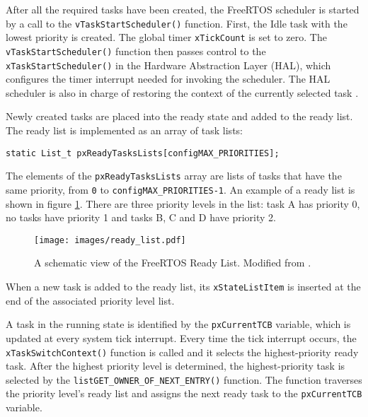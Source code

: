 After all the required tasks have been created, the FreeRTOS scheduler is started by a call to the 
\verb$vTaskStartScheduler()$ function. 
First, the Idle task with the lowest priority is created.
The global timer \verb$xTickCount$ is set to zero. 
The \verb$vTaskStartScheduler()$ function then passes control to the \verb$xTaskStartScheduler()$ in the Hardware Abstraction Layer (HAL), which configures the timer interrupt needed for invoking the scheduler. 
The HAL scheduler is also in charge of restoring the context of the currently selected task
\cite{goyette2007analysis}. 

Newly created tasks are placed into the ready state and added to the ready list. 
The ready list is implemented as an array of task lists:
\begin{lstlisting}[frame=none, label={lst:readylist}, caption={Ready task list}, captionpos=b]
static List_t pxReadyTasksLists[configMAX_PRIORITIES];
\end{lstlisting}
The elements of the \verb$pxReadyTasksLists$ array are lists of tasks that have the same priority, from \verb$0$ to \verb$configMAX_PRIORITIES-1$.
An example of a ready list is shown in figure \ref{freertos:ready}.
There are three priority levels in the list: task A has priority 0, no tasks have priority 1 and tasks B, C and D have priority 2. 

\begin{figure}[ht]
    \centering
    \texttt{[image: images/ready\_list.pdf]}
    \caption{A schematic view of the FreeRTOS Ready List. Modified from \cite{brown2012architecture}.}
    \label{freertos:ready}
\end{figure}
When a new task is added to the ready list, its \verb$xStateListItem$ is inserted at the end of the 
associated priority level list.

A task in the running state is identified by the \verb$pxCurrentTCB$ variable, which is updated at every system tick interrupt. 
Every time the tick interrupt occurs, the \verb$xTaskSwitchContext()$ function is called and it selects the highest-priority ready task.
After the highest priority level is determined,
the highest-priority task is selected by the \verb$listGET_OWNER_OF_NEXT_ENTRY()$ function.
The function traverses the priority level's ready list and assigns the next ready task to the \verb$pxCurrentTCB$ variable.

